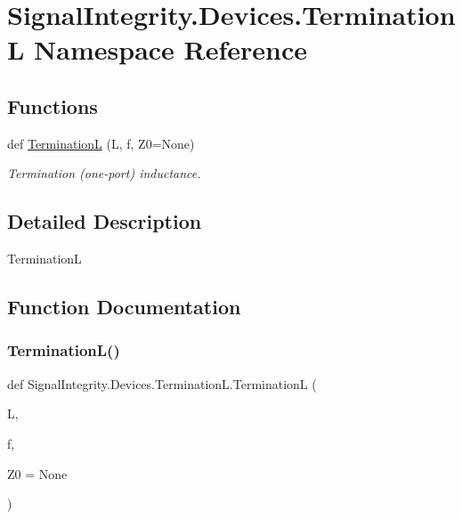 \hypertarget{namespaceSignalIntegrity_1_1Devices_1_1TerminationL}{}\section{Signal\+Integrity.\+Devices.\+TerminationL Namespace Reference}
\label{namespaceSignalIntegrity_1_1Devices_1_1TerminationL}
\subsection*{Functions}
\begin{DoxyCompactItemize}
\item 
def \hyperlink{namespaceSignalIntegrity_1_1Devices_1_1TerminationL_a70a94dce43d1062166d18f2f38c3bf94}{TerminationL} (L, f, Z0=None)
\begin{DoxyCompactList}\small\item\em Termination (one-\/port) inductance. \end{DoxyCompactList}\end{DoxyCompactItemize}


\subsection{Detailed Description}
\begin{DoxyVerb}TerminationL\end{DoxyVerb}
 

\subsection{Function Documentation}
\mbox{\label{namespaceSignalIntegrity_1_1Devices_1_1TerminationL_a70a94dce43d1062166d18f2f38c3bf94}} 
\subsubsection{\texorpdfstring{Termination\+L()}{TerminationL()}}
{\footnotesize\ttfamily def Signal\+Integrity.\+Devices.\+Termination\+L.\+TerminationL (\begin{DoxyParamCaption}\item[{}]{L,  }\item[{}]{f,  }\item[{}]{Z0 = {\ttfamily None} }\end{DoxyParamCaption})}



